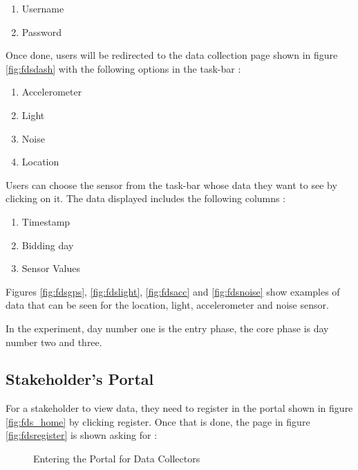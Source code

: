 \begin{enumerate}
    \item Username
    \item Password
\end{enumerate}

Once done, users will be redirected to the data collection page shown in figure \ref{fig:fdsdash} with the following options in the task-bar :

\begin{enumerate}
    \item Accelerometer
    \item Light
    \item Noise
    \item Location
\end{enumerate}

Users can choose the sensor from the task-bar whose data they want to see by clicking on it. The data displayed includes the following columns :

\begin{enumerate}
    \item Timestamp
    \item Bidding day
    \item Sensor Values
\end{enumerate}

Figures \ref{fig:fdsgps}, \ref{fig:fdslight}, \ref{fig:fdsacc} and \ref{fig:fdsnoise} show examples of data that can be seen for the location,
light, accelerometer and noise sensor.

In the experiment, day number one is the entry phase, the core phase is day number two and three.

\subsection{Stakeholder's Portal}

For a stakeholder to view data, they need to register in the portal shown in figure \ref{fig:fds_home} by clicking register. Once that is done,
the page in figure \ref{fig:fdsregister} is shown asking for :

\begin{figure}[htp]
  \hspace{1em}
  \caption{Entering the Portal for Data Collectors}
  \label{fig:fds4}
\end{figure}

